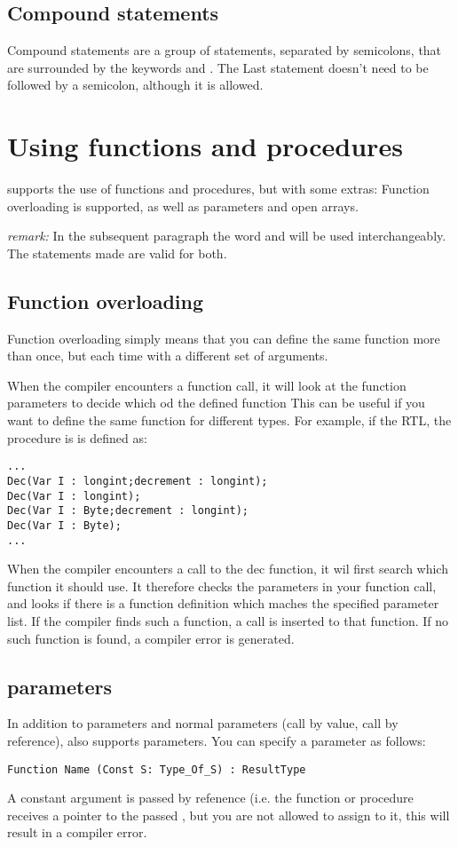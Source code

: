 \documentclass{report}
\begin{document}
\subsection{Compound statements}
Compound statements are a group of statements, separated by semicolons,
that are surrounded by the keywords  and . The
Last statement doesn't need to be followed by a semicolon, although it is
allowed.

\section{Using functions and procedures}
\fpc supports the use of functions and procedures, but with some extras:
Function overloading is supported, as well as  parameters and
open arrays.

{\em remark:} In the subsequent paragraph the word  and
 will be used interchangeably. The statements made are
valid for both.

\subsection{Function overloading}
Function overloading simply means that you can define the same function more
than once, but each time with a different set of arguments.

When the compiler encounters a function call, it will look at the function
parameters to decide which od the defined function
This can be useful if you want to define the same function for different
types. For example, if the RTL, the   procedure is
is defined as:
\begin{verbatim}
...
Dec(Var I : longint;decrement : longint);
Dec(Var I : longint);
Dec(Var I : Byte;decrement : longint);
Dec(Var I : Byte);
...
\end{verbatim}
When the compiler encounters a call to the dec function, it wil first search
which function it should use. It therefore checks the parameters in your
function call, and looks if there is a function definition which maches the
specified parameter list. If the compiler finds such a function, a call is
inserted to that function. If no such function is found, a compiler error is
generated.

\subsection{ parameters}
In addition to  parameters and normal parameters (call by value,
call by reference), \fpc also supports  parameters. You can
specify a  parameter as follows:
\begin{verbatim}
Function Name (Const S: Type_Of_S) : ResultType
\end{verbatim}
A constant argument is passed by refenence 
(i.e. the function or procedure receives a pointer to the passed , 
but you are not allowed to assign to it, this will result in a compiler error.
\end{document}
